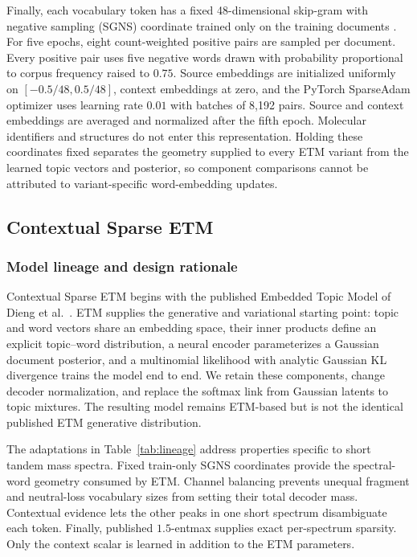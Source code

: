 \documentclass[10pt,a4paper]{article}
\begin{document}
Finally, each vocabulary token has a fixed 48-dimensional skip-gram with
negative sampling (SGNS) coordinate trained only on the training documents
\cite{mikolov2013}. For five epochs, eight count-weighted positive pairs are
sampled per document. Every positive pair uses five negative words drawn with
probability proportional to corpus frequency raised to $0.75$. Source
embeddings are initialized uniformly on $[-0.5/48,0.5/48]$, context embeddings
at zero, and the PyTorch SparseAdam optimizer uses learning rate $0.01$ with
batches of 8,192 pairs.
Source and context embeddings are averaged and normalized after the fifth
epoch. Molecular identifiers and structures do not enter this representation.
Holding these coordinates fixed separates the geometry supplied to every ETM
variant from the learned topic vectors and posterior, so component comparisons
cannot be attributed to variant-specific word-embedding updates.

\subsection{Contextual Sparse ETM}

\subsubsection{Model lineage and design rationale}

Contextual Sparse ETM begins with the published Embedded Topic Model of
Dieng et al.\ \cite{dieng2020}. ETM supplies the generative and
variational starting point: topic and word vectors share an embedding space, their
inner products define an explicit topic--word distribution, a neural encoder
parameterizes a Gaussian document posterior, and a multinomial likelihood with
analytic Gaussian KL divergence trains the model end to end. We retain these
components, change decoder normalization, and replace the softmax link from
Gaussian latents to topic mixtures. The resulting model remains ETM-based but
is not the identical published ETM generative distribution.

The adaptations in Table~\ref{tab:lineage} address properties specific to short
tandem mass spectra. Fixed train-only SGNS coordinates provide the spectral-word
geometry consumed by ETM. Channel balancing prevents unequal fragment and
neutral-loss vocabulary sizes from setting their total decoder mass. Contextual
evidence lets the other peaks in one short spectrum disambiguate each token.
Finally, published $1.5$-entmax supplies exact per-spectrum sparsity. Only the
context scalar is learned in addition to the ETM parameters.
\end{document}
